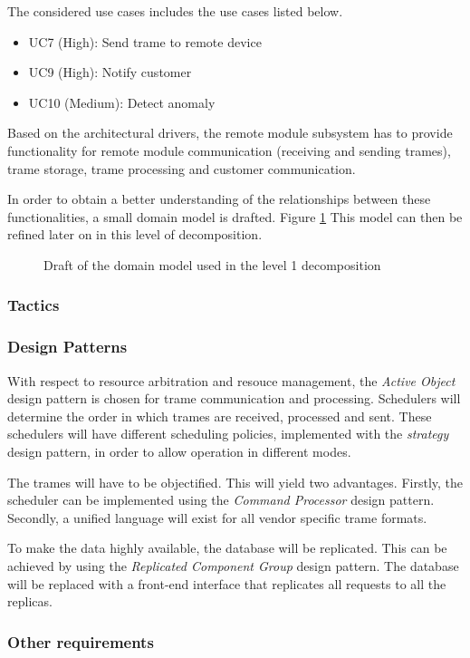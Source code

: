 \npar The considered use cases includes the use cases listed below. 

\begin{itemize}
	\item UC7 (High): Send trame to remote device
	\item UC9 (High): Notify customer
	\item UC10 (Medium): Detect anomaly
\end{itemize}

\npar Based on the architectural drivers, the remote module subsystem has to
provide functionality for remote module communication (receiving and sending
trames), trame storage, trame processing and customer communication. 

\npar In order to obtain a better understanding of the relationships between
these functionalities, a small domain model is drafted. Figure
\ref{fig:dec/whole-system/draft} This model can then be refined later on
in this level of decomposition.

\begin{figure}[H]
	\begin{centering}
		\caption{Draft of the domain model used in the level 1 decomposition}
		\label{fig:dec/whole-system/draft}
	\end{centering}
\end{figure}

\subsubsection{Tactics}
\label{tactics:whole-system}



\subsubsection{Design Patterns}
\label{dp:whole-system}

\npar With respect to resource arbitration and resouce management, the
\emph{Active Object} design pattern is chosen for trame communication and
processing. Schedulers will determine the order in which trames are received,
processed and sent. These schedulers will have different scheduling policies,
implemented with the \emph{strategy} design pattern, in order to allow operation
in different modes.

\npar The trames will have to be objectified. This will yield two advantages.
Firstly, the scheduler can be implemented using the \emph{Command Processor}
design pattern. Secondly, a unified language will exist for all vendor
specific trame formats.

\npar To make the data highly available, the database will be replicated. This
can be achieved by using the \emph{Replicated Component Group} design pattern.
The database will be replaced with a front-end interface that replicates all
requests to all the replicas. 

\subsubsection{Other requirements}
\label{others:whole-system}


